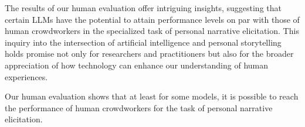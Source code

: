 The results of our human evaluation offer intriguing insights, suggesting that certain LLMs have the potential to attain performance levels on par with those of human crowdworkers in the specialized task of personal narrative elicitation. This inquiry into the intersection of artificial intelligence and personal storytelling holds promise not only for researchers and practitioners but also for the broader appreciation of how technology can enhance our understanding of human experiences.


Our human evaluation shows that at least for some models, it is possible to reach the performance of human crowdworkers for the task of personal narrative elicitation.

